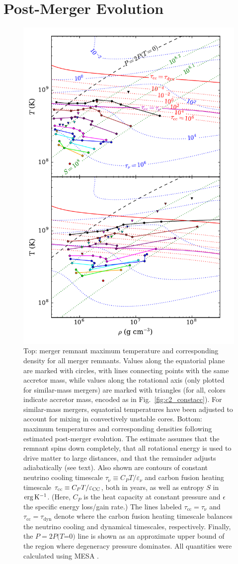 \section{Post-Merger Evolution}
\label{sec:c2_postmerger}

\begin{figure}
\centering
\includegraphics[angle=0,width=0.7\columnwidth]{chapter2_zhu+13/figures/Willitexplode.pdf}
\caption{Top: merger remnant maximum temperature {\Tmax} and corresponding density {\rhoTmax} for all merger remnants.  Values along the equatorial plane are marked with circles, with lines connecting points with the same accretor mass, while values along the rotational axis (only plotted for similar-mass mergers) are marked with triangles (for all, colors indicate accretor mass, encoded as in Fig.~\ref{fig:c2_constacc}).  For similar-mass mergers, equatorial temperatures have been adjusted to account for mixing in convectively unstable cores.  Bottom: maximum temperatures and corresponding densities following estimated post-merger evolution.  The estimate assumes that the remnant spins down completely, that all rotational energy is used to drive matter to large distances, and that the remainder adjusts adiabatically (see text).  Also shown are contours of constant neutrino cooling timescale $\tau_\mathrm{\nu}\equiv C_P T/\varepsilon_\nu$ and carbon fusion heating timescale $\tau_\mathrm{cc}\equiv C_P T/\varepsilon_{\rm CC}$, both in years, as well as entropy $S$ in ${\rm erg\,K^{-1}}$.  (Here, $C_P$ is the heat capacity at constant pressure and $\epsilon$ the specific energy loss/gain rate.)  The lines labeled $\tau_\mathrm{cc} = \tau_\mathrm{\nu}$ and $\tau_\mathrm{cc} = \tau_\mathrm{dyn}$ denote where the carbon fusion heating timescale balances the neutrino cooling and dynamical timescales, respectively.  Finally, the $P = 2P(T$=$0)$ line is shown as an approximate upper bound of the region where degeneracy pressure dominates.  All quantities were calculated using MESA \citep{paxt+11}.}

\end{figure}

